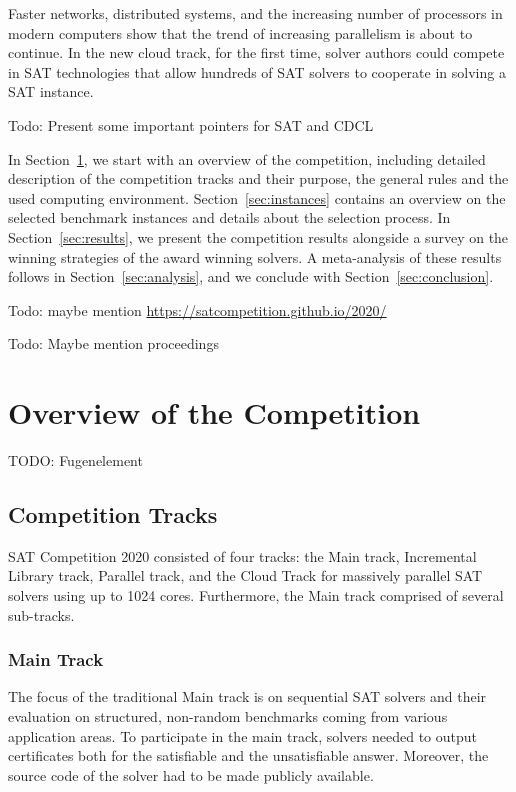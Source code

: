 \documentclass{elsarticle}
\newcommand{\todo}[1]{{\color{purple}Todo: #1}}
\begin{document}
Faster networks, distributed systems, and the increasing number of processors in modern computers show that the trend of increasing parallelism is about to continue.  
In the new cloud track, for the first time, solver authors could compete in SAT technologies that allow hundreds of SAT solvers to cooperate in solving a SAT instance. 

\todo{Present some important pointers for SAT and CDCL}

In Section~\ref{sec:overview}, we start with an overview of the competition,
including detailed description of the competition tracks and their purpose,
the general rules and the used computing environment.
Section~\ref{sec:instances} contains an overview on the selected benchmark instances and details about the selection process. 
In Section~\ref{sec:results}, we present the competition results alongside a survey on the winning strategies of the award winning solvers. 
A meta-analysis of these results follows in Section~\ref{sec:analysis}, and we conclude with Section~\ref{sec:conclusion}.

\todo{maybe mention \url{https://satcompetition.github.io/2020/}}

\todo{Maybe mention proceedings \cite{SC2020}}

\section{Overview of the Competition}
\label{sec:overview}

TODO: Fugenelement

\subsection{Competition Tracks}

SAT Competition 2020 consisted of four tracks:
the Main track, Incremental Library track, Parallel track,
and the Cloud Track for massively parallel SAT solvers using up to 1024 cores. 
Furthermore, the Main track comprised of several sub-tracks.

\subsubsection{Main Track}

The focus of the traditional Main track is on sequential SAT solvers and their evaluation on structured, non-random benchmarks coming from various application areas. To participate in the main track, solvers needed to output certificates both for the satisfiable and the unsatisfiable answer. Moreover, the source code of the solver had to be made publicly available. 
\end{document}
